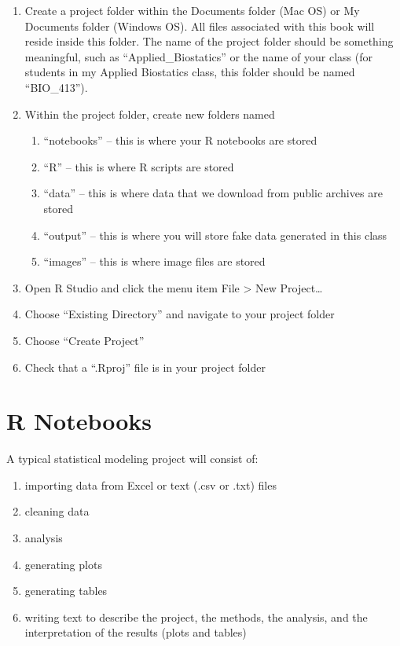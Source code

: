 \documentclass[]{book}
\providecommand{\tightlist}{%
  \setlength{\itemsep}{0pt}\setlength{\parskip}{0pt}}
\begin{document}
\begin{enumerate}
\def\labelenumi{\arabic{enumi}.}
\tightlist
\item
  Create a project folder within the Documents folder (Mac OS) or My
  Documents folder (Windows OS). All files associated with this book
  will reside inside this folder. The name of the project folder should
  be something meaningful, such as ``Applied\_Biostatics'' or the name
  of your class (for students in my Applied Biostatics class, this
  folder should be named ``BIO\_413'').
\item
  Within the project folder, create new folders named

  \begin{enumerate}
  \def\labelenumii{\arabic{enumii}.}
  \tightlist
  \item
    ``notebooks'' -- this is where your R notebooks are stored
  \item
    ``R'' -- this is where R scripts are stored
  \item
    ``data'' -- this is where data that we download from public archives
    are stored
  \item
    ``output'' -- this is where you will store fake data generated in
    this class
  \item
    ``images'' -- this is where image files are stored
  \end{enumerate}
\item
  Open R Studio and click the menu item File \textgreater{} New
  Project\ldots{}
\item
  Choose ``Existing Directory'' and navigate to your project folder
\item
  Choose ``Create Project''
\item
  Check that a ``.Rproj'' file is in your project folder
\end{enumerate}

\section{R Notebooks}\label{r-notebooks}

A typical statistical modeling project will consist of:

\begin{enumerate}
\def\labelenumi{\arabic{enumi}.}
\tightlist
\item
  importing data from Excel or text (.csv or .txt) files
\item
  cleaning data
\item
  analysis
\item
  generating plots
\item
  generating tables
\item
  writing text to describe the project, the methods, the analysis, and
  the interpretation of the results (plots and tables)
\end{enumerate}
\end{document}
